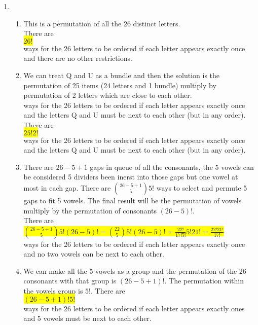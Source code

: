 \documentclass{article}
\begin{document}
\begin{enumerate}
\begin{enumerate}
	\end{enumerate}
	
	\item
	\begin{enumerate}
		
		\item 
		\mysolu
		This is a permutation of all the 26 distinct letters.\\
		\myansw
		There are\\
		\colorbox{yellow}{
			${26!}$
		}\\
		ways for the 26 letters to be ordered if each letter appears exactly once and there are no other restrictions.\\
		
		\item
		\mysolu
		We can treat Q and U as a bundle and then the solution is the permutation of 25 items (24 letters and 1 bundle) multiply by permutation of 2 letters which are close to each other.\\
		ways for the 26 letters to be ordered if each letter appears exactly once and the letters Q and U must be next to each other (but in any order).\\
				\myansw
		There are\\
		\colorbox{yellow}{
			${25!2!}$
		}\\
		ways for the 26 letters to be ordered if each letter appears exactly once and the letters Q and U must be next to each other (but in any order).\\
		
		
		\item
		\mysolu
		There are ${26-5+1}$ gaps in queue of all the consonants, the 5 vowels can be considered 5 dividers been inerst into those gaps but one vowel at most in each gap. There are ${{26-5+1 \choose 5}5!}$ ways to select and permute 5 gaps to fit 5 vowels. The final result will be the permutation of vowels multiply by the permutation of consonants ${(26-5)!}$. \\
		\myansw
		There are\\
		\colorbox{yellow}{
			${{26-5+1 \choose 5}5!(26-5)! ={22 \choose 5}5!(26-5)! = \frac{22!}{17!5!}5!21! = \frac{22!21!}{17!}}$
		}\\
		ways for the 26 letters to be ordered if each letter appears exactly once and no two vowels can be next to each other.\\
		
		\item
		\mysolu
		We can make all the 5 vowels as a group and the permutation of the 26 consonants with that group is ${{(26-5+1)!}}$. The permutation within the vowels group is ${5!}$.
		\myansw
		There are\\
		\colorbox{yellow}{
			${(26-5+1)!5!}$
		}\\
		ways for the 26 letters to be ordered if each letter appears exactly ones and 5 vowels must be next to each other. 
		

\end{enumerate}
\end{enumerate}
\end{document}

